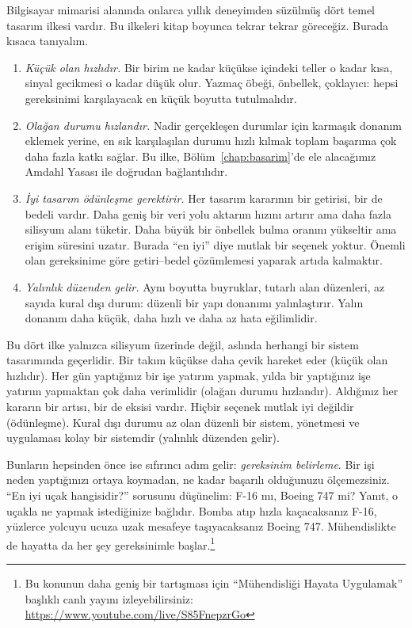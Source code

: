 Bilgisayar mimarisi alanında onlarca yıllık deneyimden süzülmüş dört temel tasarım ilkesi vardır. Bu ilkeleri kitap boyunca tekrar tekrar göreceğiz. Burada kısaca tanıyalım.

\begin{enumerate}
    \item \emph{Küçük olan hızlıdır.} Bir birim ne kadar küçükse içindeki teller o kadar kısa, sinyal gecikmesi o kadar düşük olur. Yazmaç öbeği, önbellek, çoklayıcı: hepsi gereksinimi karşılayacak en küçük boyutta tutulmalıdır.
    \item \emph{Olağan durumu hızlandır.} Nadir gerçekleşen durumlar için karmaşık donanım eklemek yerine, en sık karşılaşılan durumu hızlı kılmak toplam başarıma çok daha fazla katkı sağlar. Bu ilke, Bölüm~\ref{chap:basarim}'de ele alacağımız Amdahl Yasası ile doğrudan bağlantılıdır.
    \item \emph{İyi tasarım ödünleşme gerektirir.} Her tasarım kararının bir getirisi, bir de bedeli vardır. Daha geniş bir veri yolu aktarım hızını artırır ama daha fazla silisyum alanı tüketir. Daha büyük bir önbellek bulma oranını yükseltir ama erişim süresini uzatır. Burada ``en iyi'' diye mutlak bir seçenek yoktur. Önemli olan gereksinime göre getiri--bedel çözümlemesi yaparak artıda kalmaktır.
    \item \emph{Yalınlık düzenden gelir.} Aynı boyutta buyruklar, tutarlı alan düzenleri, az sayıda kural dışı durum: düzenli bir yapı donanımı yalınlaştırır. Yalın donanım daha küçük, daha hızlı ve daha az hata eğilimlidir.
\end{enumerate}

\begin{bilginot}
Bu dört ilke yalnızca silisyum üzerinde değil, aslında herhangi bir sistem tasarımında geçerlidir. Bir takım küçükse daha çevik hareket eder (küçük olan hızlıdır). Her gün yaptığınız bir işe yatırım yapmak, yılda bir yaptığınız işe yatırım yapmaktan çok daha verimlidir (olağan durumu hızlandır). Aldığınız her kararın bir artısı, bir de eksisi vardır. Hiçbir seçenek mutlak iyi değildir (ödünleşme). Kural dışı durumu az olan düzenli bir sistem, yönetmesi ve uygulaması kolay bir sistemdir (yalınlık düzenden gelir).

Bunların hepsinden önce ise sıfırıncı adım gelir: \emph{gereksinim belirleme}. Bir işi neden yaptığınızı ortaya koymadan, ne kadar başarılı olduğunuzu ölçemezsiniz. ``En iyi uçak hangisidir?'' sorusunu düşünelim: F-16 mı, Boeing 747 mi? Yanıt, o uçakla ne yapmak istediğinize bağlıdır. Bomba atıp hızla kaçacaksanız F-16, yüzlerce yolcuyu ucuza uzak mesafeye taşıyacaksanız Boeing 747. Mühendislikte de hayatta da her şey gereksinimle başlar.\footnote{Bu konunun daha geniş bir tartışması için ``Mühendisliği Hayata Uygulamak'' başlıklı canlı yayını izleyebilirsiniz: \url{https://www.youtube.com/live/S85FnepzrGo}}
\end{bilginot}

